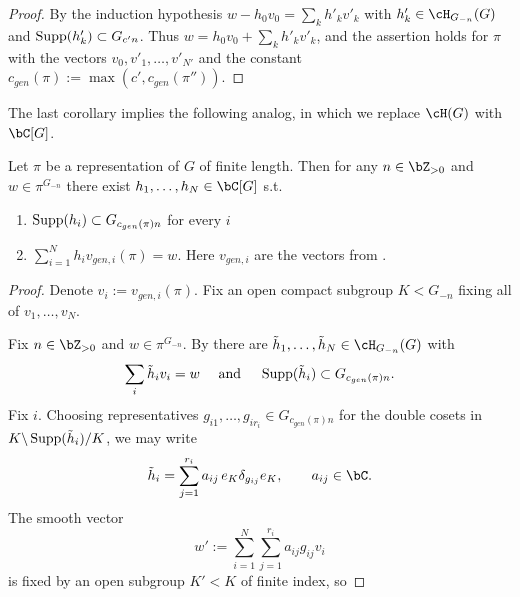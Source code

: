 \documentclass[12pt,a4paper]{amsart}%
\newcommand{\RamiB}[1]{{{#1}}}
\newcommand{\EitanE}[1]{{{#1}}}
\begin{document}
{\begin{proof}
By the induction hypothesis $w-h_0v_0=\sum_kh'_kv'_k$ with $h'_k\in\cH_{G_{-n}}(G)$ and
$\operatorname{Supp}(h'_k)\subset G_{c'n}$. Thus $w=h_0v_0+\sum_kh'_kv'_k$, and the assertion holds for $\pi$
with the vectors $v_0,v'_1,\dots,v'_{N'}$ and the constant $c_{gen}(\pi):=\max(c',c_{gen}(\pi''))$.
\end{proof}
\RamiB{
The last corollary implies the following analog, in which we replace $\cH(G)$ with $\C[G]$.
}
\begin{cor}\label{cor:gen.fin.len.alt}
      Let $\pi$ be a representation of $G$ of finite length.
\RamiB{Then
for any $n\in \Z_{>0}$ and   $w\in \pi^{G_{-n}}$}
there exist
$h_1,\dots,h_N\in \C[G]$ s.t.
\begin{enumerate}
    \item $\operatorname{Supp}(h_i)\subset G_{c_{gen}(\pi)n}$ for every $i$
    \item $\RamiB{\sum_{i=1}^N}h_iv_{gen,i}(\pi)=w$. \EitanE{Here  $v_{gen,i}$ are the vectors from .}
\end{enumerate}
\end{cor}
\RamiB{
\begin{proof}
\RamiB{Denote  $v_i:=v_{gen,i}(\pi)$.
F}ix an open compact subgroup $\RamiB{K}<\RamiB{G_{-n}}$ fixing all of
$v_1,\dots,v_N$.

Fix $n\in\Z_{>0}$ and $w\in\pi^{G_{-n}}$. By \Cref{cor:supph.fl.alt} there are
$\tilde h_1,\dots,\tilde h_N\in\cH_{G_{-n}}(G)$ with
\begin{equation}\label{eq:h.v.w}
\sum_i\tilde h_iv_i=w
\quad \text{ and } \quad 
\operatorname{Supp}(\tilde h_i)\subset G_{c_{gen}(\pi)n}.
\end{equation}
Fix $i$. Choosing representatives $g_{i1},\dots,g_{ir_i}\in G_{c_{gen}(\pi)n}$ for the double
cosets in $\RamiB{K}\backslash\supp(\tilde h_i)/\RamiB{K}$, we may write
\begin{equation}\label{eq:h.dec}
\tilde h_i=\sum_{j=1}^{r_i} a_{ij}\,\RamiB{e_{K}}\delta_{g_{ij}}\RamiB{e_{K}},
\qquad a_{ij}\in\C.
\end{equation}
The smooth vector
$$w':=\sum_{i=1}^N\sum_{j=1}^{r_i}a_{ij}g_{ij}v_i$$ is fixed by an open subgroup $K'<K$ of finite
index, so


\end{proof}}}
\end{document}
